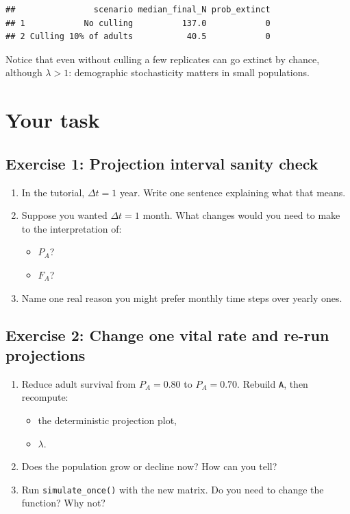 \documentclass[
  a4paper]{book}
\providecommand{\tightlist}{%
  \setlength{\itemsep}{0pt}\setlength{\parskip}{0pt}}
\begin{document}
\begin{verbatim}
##                scenario median_final_N prob_extinct
## 1            No culling          137.0            0
## 2 Culling 10% of adults           40.5            0
\end{verbatim}

Notice that even without culling a few replicates can go extinct by chance, although \(\lambda > 1\): demographic stochasticity matters in small populations.

\section{Your task}\label{your-task-13}

\subsection{Exercise 1: Projection interval sanity check}\label{exercise-1-projection-interval-sanity-check}

\begin{enumerate}
\def\labelenumi{\arabic{enumi}.}
\tightlist
\item
  In the tutorial, \(\Delta t = 1\) year. Write one sentence explaining what that means.
\item
  Suppose you wanted \(\Delta t = 1\) month. What changes would you need to make to the interpretation of:

  \begin{itemize}
  \tightlist
  \item
    \(P_A\)?
  \item
    \(F_A\)?
  \end{itemize}
\item
  Name one real reason you might prefer monthly time steps over yearly ones.
\end{enumerate}

\subsection{Exercise 2: Change one vital rate and re-run projections}\label{exercise-2-change-one-vital-rate-and-re-run-projections}

\begin{enumerate}
\def\labelenumi{\arabic{enumi}.}
\tightlist
\item
  Reduce adult survival from \(P_A = 0.80\) to \(P_A = 0.70\). Rebuild \texttt{A}, then recompute:

  \begin{itemize}
  \tightlist
  \item
    the deterministic projection plot,
  \item
    \(\lambda\).
  \end{itemize}
\item
  Does the population grow or decline now? How can you tell?
\item
  Run \texttt{simulate\_once()} with the new matrix. Do you need to change the function? Why not?
\end{enumerate}
\end{document}
